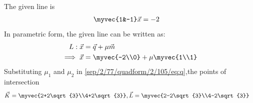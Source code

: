 The given line is
\begin{align} 
\myvec{1&-1}\vec{x}&=-2
\end{align}
 In parametric form, the given  line can be written as:
\begin{align} 
L: \vec{x}&=\vec{q}+\mu\vec{m}
\\
\implies \vec{x}&=\myvec{-2\\0}+\mu\myvec{1\\1} \label{sep/2/77/quadform/2/105/eq:q}
\end{align}
Substituting $\mu_1$ and $\mu_2$ in \eqref{sep/2/77/quadform/2/105/eq:q},the points of intersection
\begin{align}
 \vec{K}= \myvec{2+2\sqrt{3}\\4+2\sqrt{3}},  
\vec{L}&= \myvec{2-2\sqrt{3}\\4-2\sqrt{3}}
\end{align}

